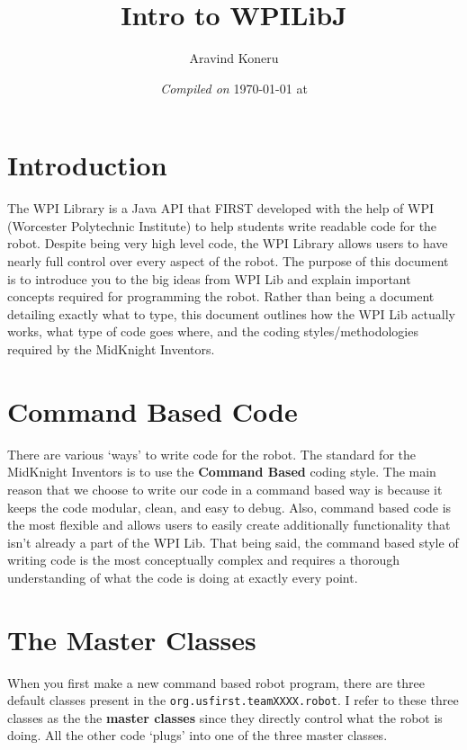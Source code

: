\documentclass[11pt,fleqn]{article}
\begin{document}
\title{Intro to WPILibJ}%
\author{Aravind Koneru}
\date{\textit{Compiled on} \today \hspace{1mm} at \currenttime}
\maketitle

\section{Introduction}

The WPI Library is a Java API that FIRST developed with the help of WPI (Worcester Polytechnic Institute)
to help students write readable code for the robot. Despite being very high level code, the WPI Library
allows users to have nearly full control over every aspect of the robot. The purpose of this document
is to introduce you to the big ideas from WPI Lib and explain important concepts required for programming
the robot. Rather than being a document detailing exactly what to type, this document outlines how the
WPI Lib actually works, what type of code goes where, and the coding styles/methodologies required by
the MidKnight Inventors.

\section{Command Based Code}

There are various `ways' to write code for the robot. The standard for the MidKnight Inventors is to use
the \textbf{Command Based} coding style. The main reason that we choose to write our code in a command
based way is because it keeps the code modular, clean, and easy to debug. Also, command based code is
the most flexible and allows users to easily create additionally functionality that isn't already a part
of the WPI Lib. That being said, the command based style of writing code is the most conceptually complex
and requires a thorough understanding of what the code is doing at exactly every point.

\section{The Master Classes}

When you first make a new command based robot program, there are three default classes present in the
\texttt{org.usfirst.teamXXXX.robot}. I refer to these three classes as the the \textbf{master classes}
since they directly control what the robot is doing. All the other code `plugs' into one of the three
master classes.
\end{document}

